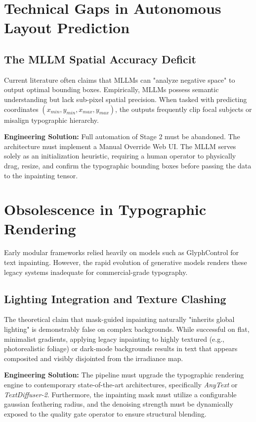 \documentclass[10pt,journal,compsoc]{IEEEtran}
\begin{document}
\section{Technical Gaps in Autonomous Layout Prediction}
\subsection{The MLLM Spatial Accuracy Deficit}
Current literature often claims that MLLMs can "analyze negative space" to output optimal bounding boxes. Empirically, MLLMs possess semantic understanding but lack sub-pixel spatial precision. When tasked with predicting coordinates $(x_{min}, y_{min}, x_{max}, y_{max})$, the outputs frequently clip focal subjects or misalign typographic hierarchy.

\textbf{Engineering Solution:} Full automation of Stage 2 must be abandoned. The architecture must implement a Manual Override Web UI. The MLLM serves solely as an initialization heuristic, requiring a human operator to physically drag, resize, and confirm the typographic bounding boxes before passing the data to the inpainting tensor.

\section{Obsolescence in Typographic Rendering}
Early modular frameworks relied heavily on models such as GlyphControl for text inpainting. However, the rapid evolution of generative models renders these legacy systems inadequate for commercial-grade typography.

\subsection{Lighting Integration and Texture Clashing}
The theoretical claim that mask-guided inpainting naturally "inherits global lighting" is demonstrably false on complex backgrounds. While successful on flat, minimalist gradients, applying legacy inpainting to highly textured (e.g., photorealistic foliage) or dark-mode backgrounds results in text that appears composited and visibly disjointed from the irradiance map.

\textbf{Engineering Solution:} The pipeline must upgrade the typographic rendering engine to contemporary state-of-the-art architectures, specifically \textit{AnyText} or \textit{TextDiffuser-2}. Furthermore, the inpainting mask must utilize a configurable gaussian feathering radius, and the denoising strength must be dynamically exposed to the quality gate operator to ensure structural blending.
\end{document}
